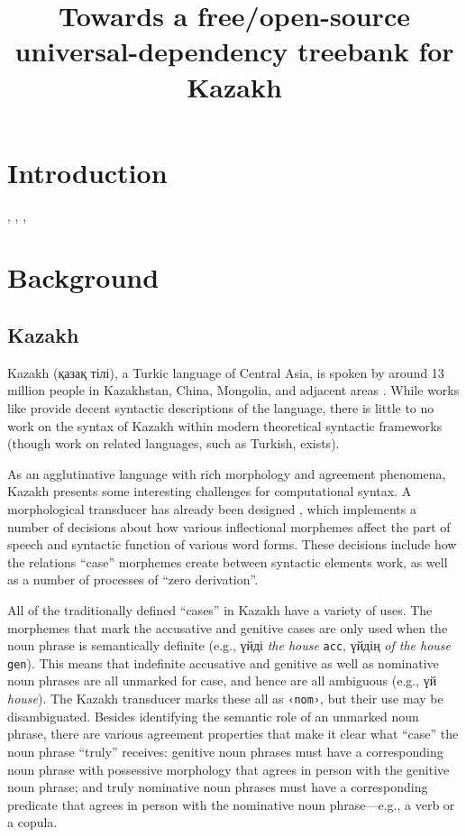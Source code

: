\documentclass[a4paper,11pt, onecolumn,twoside]{article}
\title{Towards a free/open-source universal-dependency treebank for Kazakh}
\newcommand{\gmk}[1]{\texttt{#1}}
\newcommand{\gloss}[1]{{\em #1}}
\newcommand{\tag}[1]{\texttt{‹#1›}}
\begin{document}
\maketitleabstract{}
\thispagestyle{firststyle}

\section{Introduction}

\textcite{Lynn12}, \textcite{Atalay03}, \textcite{Oflazer03}, \textcite{DeMarneffe14}

\section{Background}

\subsection{Kazakh}\label{sec:kazakh}

Kazakh (қазақ тілі), a Turkic language of Central Asia, is spoken by around 13 million people in Kazakhstan, China, Mongolia, and adjacent areas \parencite{ethnologue}.  While works like \textcite{Balaqayev54} provide decent syntactic descriptions of the language, there is little to no work on the syntax of Kazakh within modern theoretical syntactic frameworks (though work on related languages, such as Turkish, exists).

As an agglutinative language with rich morphology and agreement phenomena, Kazakh presents some interesting challenges for computational syntax.  A morphological transducer has already been designed \parencite{Washington14}, which implements a number of decisions about how various inflectional morphemes affect the part of speech and syntactic function of various word forms.  These decisions include how the relations ``case'' morphemes create between syntactic elements work, as well as a number of processes of ``zero derivation''.

All of the traditionally defined ``cases'' in Kazakh have a variety of uses.  The morphemes that mark the accusative and genitive cases are only used when the noun phrase is semantically definite (e.g., үйді \gloss{the house} \gmk{acc}, үйдің \gloss{of the house} \gmk{gen}).  This means that indefinite accusative and genitive as well as nominative noun phrases are all unmarked for case, and hence are all ambiguous (e.g., үй \gloss{house}).  The Kazakh transducer marks these all as \tag{nom}, but their use may be disambiguated.  Besides identifying the semantic role of an unmarked noun phrase, there are various agreement properties that make it clear what ``case'' the noun phrase ``truly'' receives: genitive noun phrases must have a corresponding noun phrase with possessive morphology that agrees in person with the genitive noun phrase; and truly nominative noun phrases must have a corresponding predicate that agrees in person with the nominative noun phrase---e.g., a verb or a copula.
\end{document}

